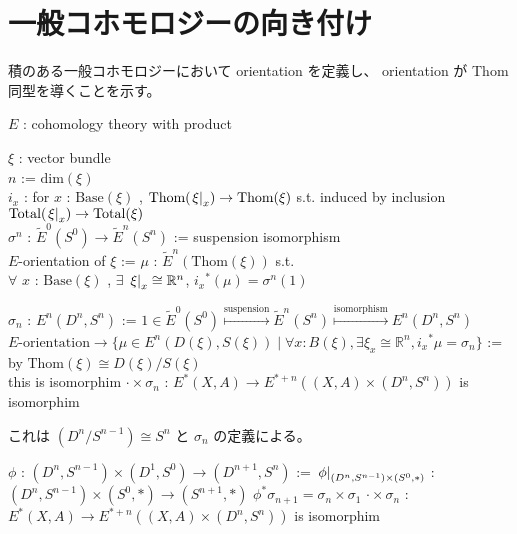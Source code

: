 \documentclass[dvipdfmx]{jsarticle}
\begin{document}
\section*{一般コホモロジーの向き付け}
積のある一般コホモロジーにおいて orientation を定義し、 orientation が Thom 同型を導くことを示す。

\begin{When}
\itemwhen \Fix \(E\) : cohomology theory with product
\end{When}

\begin{Definition}
\itemdefi
  \For \(\xi\) : vector bundle \\
  \Let \(n\) := \(\text{dim}(\xi)\) \\
  \Let \(i_{x}\) : for \(x\) : \(\text{Base}(\xi)\) , \(\text{Thom}(\left. {\xi} \right| _{x}) \to \text{Thom}(\xi)\) s.t. induced by inclusion \(\text{Total}(\left. {\xi} \right| _{x}) \to \text{Total}(\xi)\) \\
  \Let \(\sigma^n\) : \(\tilde{E}^{0}(S^0) \to \tilde{E}^{n}(S^n)\) := suspension isomorphism \\
  \Define \(E\)-orientation of \(\xi\) := \(\mu\) : \(\tilde{E}^{n}(\text{Thom}(\xi))\) s.t. \\
  \(\forall\) \(x\) : \(\text{Base}(\xi)\) , \(\exists\) \(\left. {\xi} \right| _{x} \cong \mathbb{R}^n\), \({i_x}^* (\mu) = \sigma^n(1)\)
\end{Definition}

\begin{Theorem}
\itemdefi
  \Define \(\sigma_n\) : \(E^{n}(D^n, S^n)\) := \(1 \in \tilde{E}^{0}(S^0) \overset{\text{suspension}}{\mapsto} \tilde{E}^{n}(S^n) \overset{\text{isomorphism}}{\mapsto} E^{n}(D^n, S^n)\)
\itemprop
  \Let \(E\text{-orientation} \to \{\mu \in E^{n}(D(\xi), S(\xi)) \mid \forall x: B(\xi), \exists \xi_x \cong \mathbb{R}^n, {i_x}^* \mu = \sigma_n \}\) := \\
  by \(\text{Thom}(\xi) \cong D(\xi)/S(\xi)\) \\
  \Then this is isomorphim
\itemprop
  \Then \(\cdot \times \sigma_{n}\) : \(E^*(X, A) \to E^{*+n}((X, A) \times (D^n, S^n))\) is isomorphim
\end{Theorem}

\begin{Proof}
\itemprof
   これは \((D^{n}/ S^{n-1}) \cong S^{n}\) と \(\sigma_{n}\) の定義による。
\end{Proof}

\begin{Theorem}
\itemdefi
  \Let \(\phi\) : \((D^{n}, S^{n-1}) \times (D^{1}, S^0) \to (D^{n+1}, S^{n})\) :=  \(\left. {\phi} \right| _{(D^{n}, S^{n-1}) \times (S^0, *)}\) : \((D^{n}, S^{n-1}) \times (S^0, *) \to (S^{n+1}, *)\) 
\itemprop
  \Then \(\phi^* \sigma_{n+1} = \sigma_{n} \times \sigma_{1}\)
\itemprop
  \Then \(\cdot \times \sigma_{n}\) : \(E^*(X, A) \to E^{*+n}((X, A) \times (D^n, S^n))\) is isomorphim
\end{Theorem}
\end{document}
